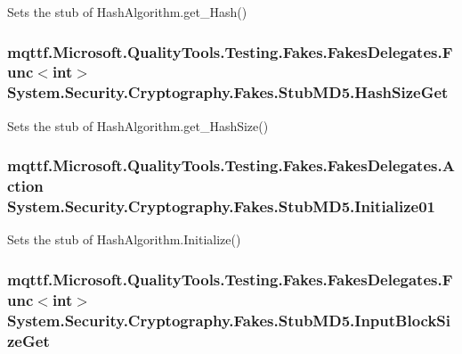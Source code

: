 Sets the stub of Hash\-Algorithm.\-get\-\_\-\-Hash()

\hypertarget{class_system_1_1_security_1_1_cryptography_1_1_fakes_1_1_stub_m_d5_ad3ba2b53dad6dbef17a5bc83554c0043}{
\subsubsection[{Hash\-Size\-Get}]{\setlength{\rightskip}{0pt plus 5cm}mqttf.\-Microsoft.\-Quality\-Tools.\-Testing.\-Fakes.\-Fakes\-Delegates.\-Func$<$int$>$ System.\-Security.\-Cryptography.\-Fakes.\-Stub\-M\-D5.\-Hash\-Size\-Get}}\label{class_system_1_1_security_1_1_cryptography_1_1_fakes_1_1_stub_m_d5_ad3ba2b53dad6dbef17a5bc83554c0043}


Sets the stub of Hash\-Algorithm.\-get\-\_\-\-Hash\-Size()

\hypertarget{class_system_1_1_security_1_1_cryptography_1_1_fakes_1_1_stub_m_d5_a59ef888de9da8ce116e7f522659ce62b}{
\subsubsection[{Initialize01}]{\setlength{\rightskip}{0pt plus 5cm}mqttf.\-Microsoft.\-Quality\-Tools.\-Testing.\-Fakes.\-Fakes\-Delegates.\-Action System.\-Security.\-Cryptography.\-Fakes.\-Stub\-M\-D5.\-Initialize01}}\label{class_system_1_1_security_1_1_cryptography_1_1_fakes_1_1_stub_m_d5_a59ef888de9da8ce116e7f522659ce62b}


Sets the stub of Hash\-Algorithm.\-Initialize()

\hypertarget{class_system_1_1_security_1_1_cryptography_1_1_fakes_1_1_stub_m_d5_a7567ba325213dd881f93f74f22e0b70e}{
\subsubsection[{Input\-Block\-Size\-Get}]{\setlength{\rightskip}{0pt plus 5cm}mqttf.\-Microsoft.\-Quality\-Tools.\-Testing.\-Fakes.\-Fakes\-Delegates.\-Func$<$int$>$ System.\-Security.\-Cryptography.\-Fakes.\-Stub\-M\-D5.\-Input\-Block\-Size\-Get}}\label{class_system_1_1_security_1_1_cryptography_1_1_fakes_1_1_stub_m_d5_a7567ba325213dd881f93f74f22e0b70e}



